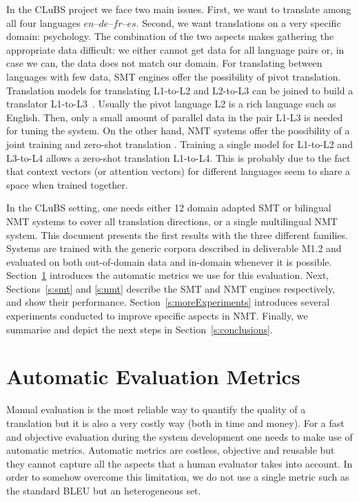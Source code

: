 \documentclass[a4paper,11pt]{article}
\newcommand{\en}{$en$}
\newcommand{\es}{$es$}
\newcommand{\fr}{$fr$}
\newcommand{\de}{$de$}
\begin{document}
In the CLuBS project we face two main issues. First, we want to translate among all four languages \en--\de--\fr--\es. Second, we want translations on a very specific domain: psychology. The combination of the two aspects makes gathering the appropriate data difficult: we either cannot get data for all language pairs or, in case we can, the data does not match our domain.  For translating between languages with few data, SMT engines offer the possibility of pivot translation. Translation models for translating L1-to-L2 and L2-to-L3 can be joined to build a translator L1-to-L3~\cite{zhuEtal:2014}. Usually the pivot language L2 is a rich language such as English. Then, only a small amount of parallel data in the pair L1-L3 is needed for tuning the system. On the other hand, NMT systems offer the possibility of a joint training and zero-shot translation \cite{johnsonEtal:2016,haEtal:2016,firatEtAlb:2016}. Training a single model for L1-to-L2 and L3-to-L4 allows a zero-shot translation L1-to-L4. This is probably due to the fact that context vectors (or attention vectors) for different languages seem to share a space when trained together. 

In the CLuBS setting, one needs either 12 domain adapted SMT or bilingual NMT systems to cover all translation directions, or a single multilingual NMT system. This document presents the first results with the three different families. Systems are trained with the generic corpora described in deliverable M1.2 and evaluated on both out-of-domain data and in-domain whenever it is possible. Section~\ref{s:eval} introduces the automatic metrics we use for this evaluation. Next, Sections~\ref{s:smt} and \ref{s:nmt} describe the SMT and NMT engines respectively, and show their performance. Section~\ref{s:moreExperiments} introduces several experiments conducted to improve specific aspects in NMT.  Finally, we summarise and depict the next steps in Section~\ref{s:conclusions}.


\section{Automatic Evaluation Metrics}
\label{s:eval}

Manual evaluation is the most reliable way to quantify the quality of a translation but it is also a very costly way (both in time and money). For a fast and objective evaluation during the system development one needs to make use of automatic metrics. Automatic metrics are costless, objective and reusable but they cannot capture all the aspects that a human evaluator takes into account. In order to somehow overcome this limitation, we do not use a single metric such as the standard BLEU but an heterogeneous set.
\end{document}
